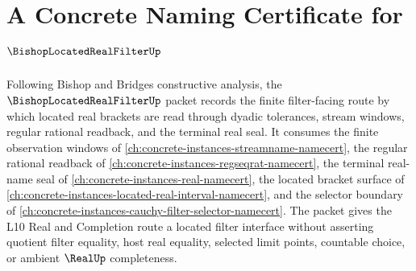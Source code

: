 \chapter{A Concrete Naming Certificate for $\BishopLocatedRealFilterUp$}
\label{ch:concrete-instances-bishop-located-real-filter-namecert}

Following Bishop and Bridges constructive analysis, the $\BishopLocatedRealFilterUp$ packet records the finite filter-facing route by which located real brackets are read through dyadic tolerances, stream windows, regular rational readback, and the terminal real seal. It consumes the finite observation windows of \autoref{ch:concrete-instances-streamname-namecert}, the regular rational readback of \autoref{ch:concrete-instances-regseqrat-namecert}, the terminal real-name seal of \autoref{ch:concrete-instances-real-namecert}, the located bracket surface of \autoref{ch:concrete-instances-located-real-interval-namecert}, and the selector boundary of \autoref{ch:concrete-instances-cauchy-filter-selector-namecert}. The packet gives the L10 Real and Completion route a located filter interface without asserting quotient filter equality, host real equality, selected limit points, countable choice, or ambient $\RealUp$ completeness.

